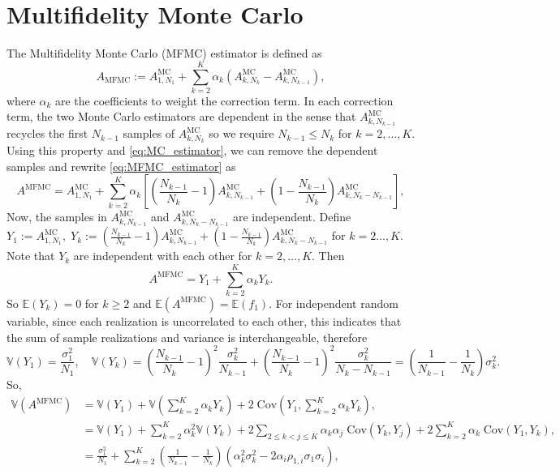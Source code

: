 \documentclass[final,3p,times,11pt]{elsarticle}
\begin{document}
\section{Multifidelity Monte Carlo}
The Multifidelity Monte Carlo (MFMC) estimator is defined as
\begin{equation}\label{eq:MFMC_estimator}
    A_{\text{MFMC}} := A^{\text{MC}}_{1,N_1} + \sum_{k=2}^K \alpha_k\left(A^{\text{MC}}_{k,N_k} - A^{\text{MC}}_{k,N_{k-1}} \right),
\end{equation}
where $\alpha_k$ are the coefficients to weight the correction term. In each correction term, the two Monte Carlo estimators are dependent in the sense that $A^{\text{MC}}_{k,N_{k-1}}$ recycles the first $N_{k-1}$ samples of $A^{\text{MC}}_{k,N_{k}}$ so we require $N_{k-1}\le N_k$ for $k=2,\ldots,K$. Using this property and \eqref{eq:MC_estimator}, we can remove the dependent samples and rewrite \eqref{eq:MFMC_estimator} as
\[
A^{\text{MFMC}} = A^{\text{MC}}_{1,N_1} +  \sum_{k=2}^K \alpha_k\left[\left(\frac{N_{k-1}}{N_{k}}-1\right)A_{k,N_{k-1}}^{\text{MC}}+\left(1-\frac{N_{k-1}}{N_{k}}\right) A_{k,N_k-N_{k-1}}^{\text{MC}}\right],
\]
Now, the samples in $A_{k,N_{k-1}}^{\text{MC}}$ and $A_{k,N_k-N_{k-1}}^{\text{MC}}$ are independent. Define $Y_1 :=A^{\text{MC}}_{1,N_1},\; Y_k:=\left(\frac{N_{k-1}}{N_{k}}-1\right)A_{k,N_{k-1}}^{\text{MC}}+\left(1-\frac{N_{k-1}}{N_{k}}\right) A_{k,N_k-N_{k-1}}^{\text{MC}}$ for $k=2\ldots, K$.  Note that $Y_k$ are independent with each other for $k=2,\ldots, K$. Then 
\[
A^{\text{MFMC}} = Y_1 + \sum_{k=2}^K \alpha_k Y_k.
\]
So $\mathbb{E}(Y_k) = 0$ for $k\ge 2$ and $\mathbb{E}(A^{\text{MFMC}}) = \mathbb{E}(f_1) $. For independent random variable, since each realization is uncorrelated to each other, this indicates that the sum of sample realizations and variance is interchangeable, therefore
\[
\mathbb{V}\left(Y_1\right) = \frac{\sigma_1^2}{N_1}, \quad \mathbb{V}\left(Y_k\right) = \left(\frac{N_{k-1}}{N_{k}}-1\right)^2\frac{\sigma_k^2}{N_{k-1}}+\left(\frac{N_{k-1}}{N_{k}}-1\right)^2\frac{\sigma_k^2}{N_k-N_{k-1}} = \left(\frac{1}{N_{k-1}} - \frac{1}{N_k}\right)\sigma_k^2.
\]
So,
\begin{align}
    \nonumber
    \mathbb{V}\left(A^{\text{MFMC}}\right) &= \mathbb{V}\left(Y_1\right) + \mathbb{V}\left(\sum_{k=2}^K \alpha_kY_k\right)+2\;\text{Cov}\left(Y_1,\sum_{k=2}^K \alpha_k Y_k \right),\\
    \nonumber
    &=\mathbb{V}\left(Y_1\right) + \sum_{k=2}^K \alpha_k^2 \mathbb{V}\left(Y_k\right)+2\sum_{2\le k<j\le K} \alpha_k\alpha_j\; \text{Cov}(Y_k,Y_j) +2\sum_{k=2}^K \alpha_k\;\text{Cov}\left(Y_1, Y_k\right),\\
    &=\frac{\sigma_1^2}{N_1} + \sum_{k=2}^K \left(\frac{1}{N_{k-1}} - \frac{1}{N_k}\right)\left(\alpha_k^2\sigma_k^2 - 2\alpha_i\rho_{1,i}\sigma_1\sigma_i\right),
\end{align}
\end{document}
